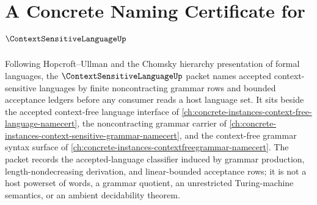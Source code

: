 \chapter{A Concrete Naming Certificate for $\ContextSensitiveLanguageUp$}
\label{ch:concrete-instances-context-sensitive-language-namecert}

Following Hopcroft--Ullman and the Chomsky hierarchy presentation of formal languages, the $\ContextSensitiveLanguageUp$ packet names accepted context-sensitive languages by finite noncontracting grammar rows and bounded acceptance ledgers before any consumer reads a host language set. It sits beside the accepted context-free language interface of \autoref{ch:concrete-instances-context-free-language-namecert}, the noncontracting grammar carrier of \autoref{ch:concrete-instances-context-sensitive-grammar-namecert}, and the context-free grammar syntax surface of \autoref{ch:concrete-instances-contextfreegrammar-namecert}. The packet records the accepted-language classifier induced by grammar production, length-nondecreasing derivation, and linear-bounded acceptance rows; it is not a host powerset of words, a grammar quotient, an unrestricted Turing-machine semantics, or an ambient decidability theorem.

